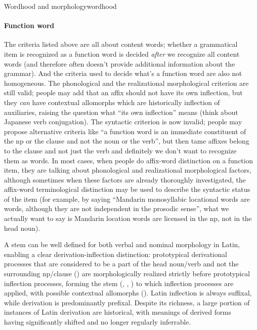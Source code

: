 \documentclass[a4paper, oneside]{report}
\begin{document}
\begin{theorybox}{Wordhood and morphology}{wordhood}
    \paragraph*{Function word} The criteria listed above are all about content words;
    whether a grammatical item is recognized as a function word 
    is decided \emph{after} we recognize all content words
    (and therefore often doesn't provide additional information about the grammar).
    And the criteria used to decide what's a function word 
    are also not homogeneous.
    The phonological and the realizational morphological criterion are still valid;
    people may add that an affix should not have its own inflection,
    but they \emph{can} have contextual allomorphs 
    which are historically inflection of auxiliaries,
    raising the question what ``its own inflection'' means 
    (think about Japanese verb conjugation).
    The syntactic criterion is now invalid; 
    people may propose alternative criteria like 
    ``a function word is an immediate constituent of the \acs{np} or the clause
    and not the noun or the verb'',
    but then \acs{tame} affixes belong to the clause and not just the verb
    and definitely we don't want to recognize them as words.
    In most cases, when people do affix-word distinction on a function item, 
    they are talking about phonological and realizational morphological factors,
    although sometimes when these factors are already thoroughly investigated, 
    the affix-word terminological distinction may be used 
    to describe the syntactic status of the item 
    (for example, by saying ``Mandarin monosyllabic locational words 
    are words, although they are not independent in the prosodic sense'',
    what we actually want to say is Mandarin location words are licensed 
    in the \acs{np}, not in the head noun).
\end{theorybox}

A stem can be well defined for both verbal and nominal morphology in Latin,
enabling a clear derivation-inflection distinction:
prototypical derivational processes that are considered 
to be a part of the head noun/verb 
and not the surrounding \acs{np}/clause ()
are morphologically realized strictly 
before prototypical inflection processes,
forming the stem 
(,
, 
) to which 
inflection processes are applied,
with possible contextual allomorphs
(). 
Latin inflection is always suffixal,
while derivation is predominantly prefixal.
Despite its richness, 
a large portion of instances of Latin derivation are historical,
with meanings of derived forms 
having significantly shifted and no longer regularly inferrable.
\end{document}
